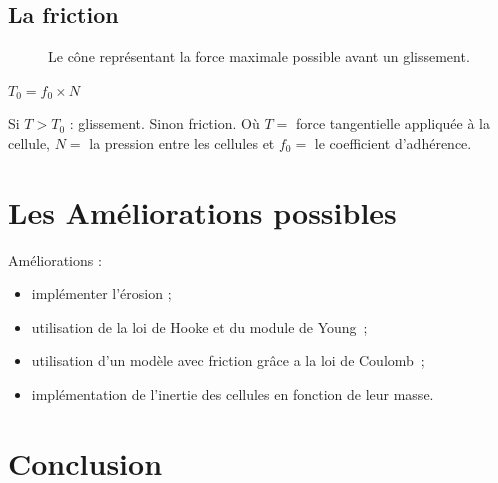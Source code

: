 \documentclass{beamer}
\begin{document}
\subsection{La friction}
\begin{frame}
  \begin{figure}
    \begin{center}
    \end{center}
    \caption{Le cône représentant la force maximale possible avant un glissement.}
  \end{figure}
  \begin{center}
    $T_0 = f_0 \times N$
  \end{center}
  Si $T > T_0$ : glissement. Sinon friction. \smallbreak
  Où $T = $ force tangentielle appliquée à la cellule, $N = $ la pression entre les cellules et $f_0 = $ le coefficient d'adhérence.
\end{frame}

\section{Les Améliorations possibles}
\begin{frame}
  Améliorations :
  \begin{itemize}
    \item implémenter l'érosion ;
    \item utilisation de la loi de Hooke et du module de Young~;
    \item utilisation d'un modèle avec friction grâce a la loi de Coulomb~;
    \item implémentation de l'inertie des cellules en fonction de leur masse.
  \end{itemize}
\end{frame}

\section{Conclusion}
\begin{frame}
 
\end{frame}
\end{document}
